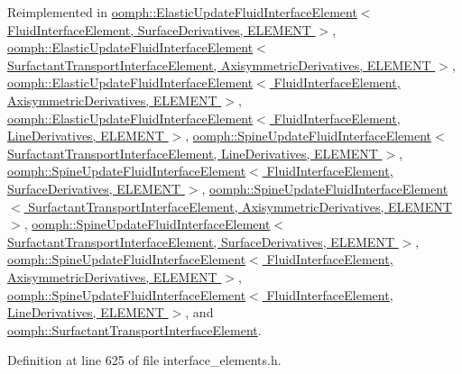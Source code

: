 Reimplemented in \hyperlink{classoomph_1_1ElasticUpdateFluidInterfaceElement_a46b22d178b248355083a3564e4e92eb0}{oomph\+::\+Elastic\+Update\+Fluid\+Interface\+Element$<$ Fluid\+Interface\+Element, Surface\+Derivatives, E\+L\+E\+M\+E\+N\+T $>$}, \hyperlink{classoomph_1_1ElasticUpdateFluidInterfaceElement_a46b22d178b248355083a3564e4e92eb0}{oomph\+::\+Elastic\+Update\+Fluid\+Interface\+Element$<$ Surfactant\+Transport\+Interface\+Element, Axisymmetric\+Derivatives, E\+L\+E\+M\+E\+N\+T $>$}, \hyperlink{classoomph_1_1ElasticUpdateFluidInterfaceElement_a46b22d178b248355083a3564e4e92eb0}{oomph\+::\+Elastic\+Update\+Fluid\+Interface\+Element$<$ Fluid\+Interface\+Element, Axisymmetric\+Derivatives, E\+L\+E\+M\+E\+N\+T $>$}, \hyperlink{classoomph_1_1ElasticUpdateFluidInterfaceElement_a46b22d178b248355083a3564e4e92eb0}{oomph\+::\+Elastic\+Update\+Fluid\+Interface\+Element$<$ Fluid\+Interface\+Element, Line\+Derivatives, E\+L\+E\+M\+E\+N\+T $>$}, \hyperlink{classoomph_1_1SpineUpdateFluidInterfaceElement_ae2875e70d1f8eacc229ea3d4318f7de4}{oomph\+::\+Spine\+Update\+Fluid\+Interface\+Element$<$ Surfactant\+Transport\+Interface\+Element, Line\+Derivatives, E\+L\+E\+M\+E\+N\+T $>$}, \hyperlink{classoomph_1_1SpineUpdateFluidInterfaceElement_ae2875e70d1f8eacc229ea3d4318f7de4}{oomph\+::\+Spine\+Update\+Fluid\+Interface\+Element$<$ Fluid\+Interface\+Element, Surface\+Derivatives, E\+L\+E\+M\+E\+N\+T $>$}, \hyperlink{classoomph_1_1SpineUpdateFluidInterfaceElement_ae2875e70d1f8eacc229ea3d4318f7de4}{oomph\+::\+Spine\+Update\+Fluid\+Interface\+Element$<$ Surfactant\+Transport\+Interface\+Element, Axisymmetric\+Derivatives, E\+L\+E\+M\+E\+N\+T $>$}, \hyperlink{classoomph_1_1SpineUpdateFluidInterfaceElement_ae2875e70d1f8eacc229ea3d4318f7de4}{oomph\+::\+Spine\+Update\+Fluid\+Interface\+Element$<$ Surfactant\+Transport\+Interface\+Element, Surface\+Derivatives, E\+L\+E\+M\+E\+N\+T $>$}, \hyperlink{classoomph_1_1SpineUpdateFluidInterfaceElement_ae2875e70d1f8eacc229ea3d4318f7de4}{oomph\+::\+Spine\+Update\+Fluid\+Interface\+Element$<$ Fluid\+Interface\+Element, Axisymmetric\+Derivatives, E\+L\+E\+M\+E\+N\+T $>$}, \hyperlink{classoomph_1_1SpineUpdateFluidInterfaceElement_ae2875e70d1f8eacc229ea3d4318f7de4}{oomph\+::\+Spine\+Update\+Fluid\+Interface\+Element$<$ Fluid\+Interface\+Element, Line\+Derivatives, E\+L\+E\+M\+E\+N\+T $>$}, and \hyperlink{classoomph_1_1SurfactantTransportInterfaceElement_a280f065d9cb85438c0fe4f7cd95d14b3}{oomph\+::\+Surfactant\+Transport\+Interface\+Element}.



Definition at line 625 of file interface\+\_\+elements.\+h.



